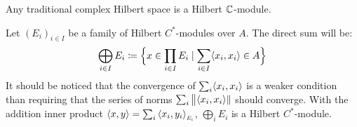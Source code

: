 \begin{exemplos}\label{exemplos de hilbert modules}
    $\left.\right.$
\begin{itroman}
    \item Any traditional complex Hilbert space is a Hilbert $\operatorname{\mathbb{C}}$-module.    
    \item \label{item: soma direta de modulos de hilbert} Let $(E_i)_{i\in I}$ be a family of Hilbert $C^*$-modules over $A$. The direct sum will be:
    \[
    \bigoplus_{i\in I}E_i \coloneqq \Big\{x \in \prod_{i\in I} E_i \mid \sum_{i\in I} \langle {x_i},{x_i}\rangle \in A\Big\}
    \]
    It should be noticed that the convergence of $\sum_i \langle {x_i},{x_i}\rangle$ is a weaker condition than requiring that the series of norms $\sum_i \big\|\langle {x_i},{x_i}\rangle\|$ should converge. With the addition inner product $\inner xy = \sum_{i} \sub{\inner{x_i}{y_i}}{E_i}$, $\bigoplus_{i} E_i$ is a Hilbert $C^*$-module.
        

\end{itroman}
\end{exemplos}
